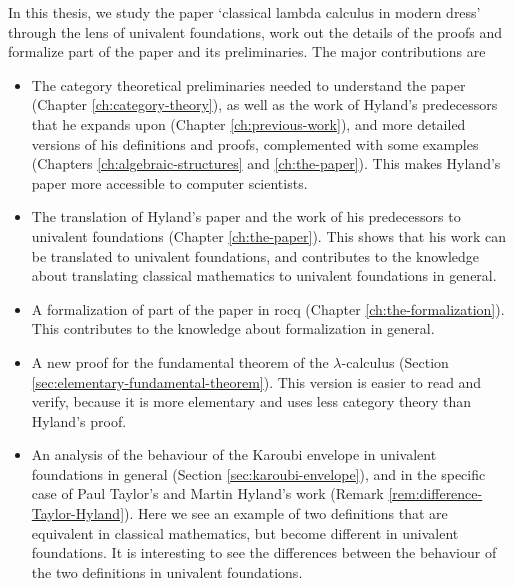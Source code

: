 In this thesis, we study the paper `classical lambda calculus in modern dress' through the lens of univalent foundations, work out the details of the proofs and formalize part of the paper and its preliminaries. The major contributions are
\begin{itemize}
  \item The category theoretical preliminaries needed to understand the paper (Chapter \ref{ch:category-theory}), as well as the work of Hyland's predecessors that he expands upon (Chapter \ref{ch:previous-work}), and more detailed versions of his definitions and proofs, complemented with some examples (Chapters \ref{ch:algebraic-structures} and \ref{ch:the-paper}). This makes Hyland's paper more accessible to computer scientists.
  \item The translation of Hyland's paper and the work of his predecessors to univalent foundations (Chapter \ref{ch:the-paper}). This shows that his work can be translated to univalent foundations, and contributes to the knowledge about translating classical mathematics to univalent foundations in general.
  \item A formalization of part of the paper in rocq (Chapter \ref{ch:the-formalization}). This contributes to the knowledge about formalization in general.
  \item A new proof for the fundamental theorem of the $ \lambda $-calculus (Section \ref{sec:elementary-fundamental-theorem}). This version is easier to read and verify, because it is more elementary and uses less category theory than Hyland's proof.
  \item An analysis of the behaviour of the Karoubi envelope in univalent foundations in general (Section \ref{sec:karoubi-envelope}), and in the specific case of Paul Taylor's and Martin Hyland's work (Remark \ref{rem:difference-Taylor-Hyland}). Here we see an example of two definitions that are equivalent in classical mathematics, but become different in univalent foundations. It is interesting to see the differences between the behaviour of the two definitions in univalent foundations.
\end{itemize}

